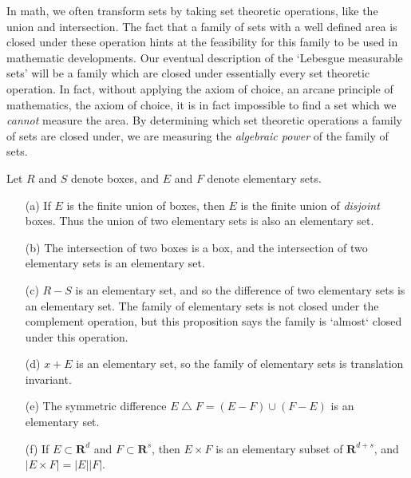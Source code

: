 In math, we often transform sets by taking set theoretic operations, like the union and intersection. The fact that a family of sets with a well defined area is closed under these operation hints at the feasibility for this family to be used in mathematic developments. Our eventual description of the `Lebesgue measurable sets' will be a family which are closed under essentially every set theoretic operation. In fact, without applying the axiom of choice, an arcane principle of mathematics, the axiom of choice, it is in fact impossible to find a set which we {\it cannot} measure the area. By determining which set theoretic operations a family of sets are closed under, we are measuring the {\it algebraic power} of the family of sets.

\begin{theorem}
  Let $R$ and $S$ denote boxes, and $E$ and $F$ denote elementary sets.
  \begin{enumerate}
      \item[(a)] If $E$ is the finite union of boxes, then $E$ is the finite union of {\it disjoint} boxes. Thus the union of two elementary sets is also an elementary set.
      \item[(b)] The intersection of two boxes is a box, and the intersection of two elementary sets is an elementary set.
      \item[(c)] $R-S$ is an elementary set, and so the difference of two elementary sets is an elementary set. The family of elementary sets is not closed under the complement operation, but this proposition says the family is `almost` closed under this operation.
      \item[(d)] $x + E$ is an elementary set, so the family of elementary sets is translation invariant.
      \item[(e)] The symmetric difference $E \bigtriangleup F = (E - F) \cup (F - E)$ is an elementary set.
      \item[(f)] If $E \subset \mathbf{R}^d$ and $F \subset \mathbf{R}^s$, then $E \times F$ is an elementary subset of $\mathbf{R}^{d+s}$, and $|E \times F| = |E||F|$.
  \end{enumerate}
\end{theorem}
